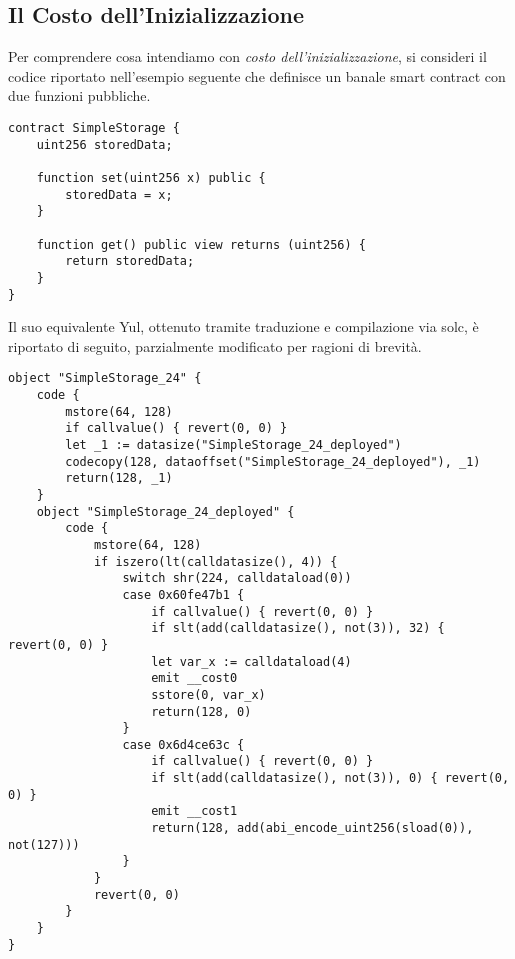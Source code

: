 \documentclass[12pt,a4paper,openright,oneside]{report}
\theoremstyle{definition}
\begin{document}
\subsection{Il Costo dell'Inizializzazione}\label{impl:costs_attribution:init_cost}
Per comprendere cosa intendiamo con \textit{costo dell'inizializzazione}, si consideri il codice riportato nell'esempio seguente che definisce un banale smart contract con due funzioni pubbliche.
\begin{lstlisting}[language=Solidity,caption=Esempio di smart contract in Solidity,label={lst:simple_storage_solidity},frame=tlrb]
contract SimpleStorage {
    uint256 storedData;

    function set(uint256 x) public {
        storedData = x;
    }

    function get() public view returns (uint256) {
        return storedData;
    }
}
\end{lstlisting}
Il suo equivalente Yul, ottenuto tramite traduzione e compilazione via solc, \`{e} riportato di seguito, parzialmente modificato per ragioni di brevit\`{a}.\\
\begin{lstlisting}[language=Solidity,caption=Versione Yul dello smart contract in \ref{lst:simple_storage_solidity},frame=tlrb]
object "SimpleStorage_24" {
    code {
        mstore(64, 128)
        if callvalue() { revert(0, 0) }
        let _1 := datasize("SimpleStorage_24_deployed")
        codecopy(128, dataoffset("SimpleStorage_24_deployed"), _1)
        return(128, _1)
    }
    object "SimpleStorage_24_deployed" {
        code {
            mstore(64, 128)
            if iszero(lt(calldatasize(), 4)) {
                switch shr(224, calldataload(0))
                case 0x60fe47b1 {
                    if callvalue() { revert(0, 0) }
                    if slt(add(calldatasize(), not(3)), 32) { revert(0, 0) }
                    let var_x := calldataload(4)
                    emit __cost0
                    sstore(0, var_x)
                    return(128, 0)
                }
                case 0x6d4ce63c {
                    if callvalue() { revert(0, 0) }
                    if slt(add(calldatasize(), not(3)), 0) { revert(0, 0) }
                    emit __cost1
                    return(128, add(abi_encode_uint256(sload(0)), not(127)))
                }
            }
            revert(0, 0)
        }
    }
}
\end{lstlisting}
\end{document}
